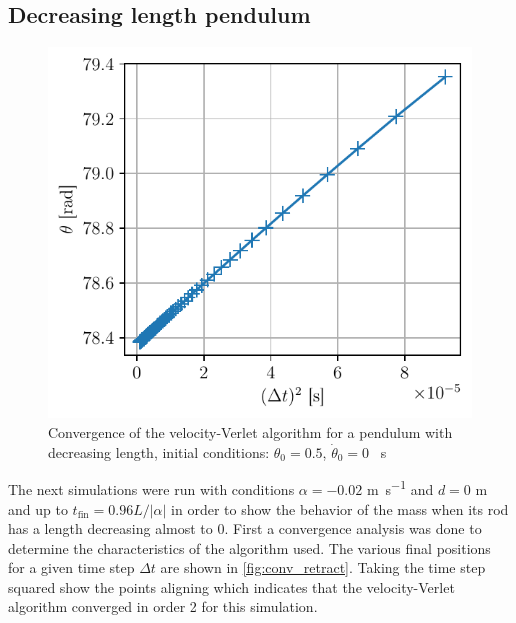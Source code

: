 \subsection{Decreasing length pendulum}
\begin{figure}
    \centering
    \includegraphics[width=\linewidth]{figures/converg_retraction.pdf}
    \caption{Convergence of the velocity-Verlet algorithm for a pendulum with decreasing length, initial conditions: $\theta_0 = 0.5$, $\dot{\theta}_0 = 0$ \si{\per\second}}
    \label{fig:conv_retract}
\end{figure}
The next simulations were run with conditions $\alpha=-0.02$ \si{\meter\per\second} and $d=0$ \si{\meter} and up to $t_\textrm{fin}=0.96L/|\alpha|$ in order to show the behavior of the mass when its rod has a length decreasing almost to 0. First a convergence analysis was done to determine the characteristics of the algorithm used. The various final positions for a given time step $\Delta t$ are shown in \autoref{fig:conv_retract}. Taking the time step squared show the points aligning which indicates that the velocity-Verlet algorithm converged in order 2 for this simulation.

